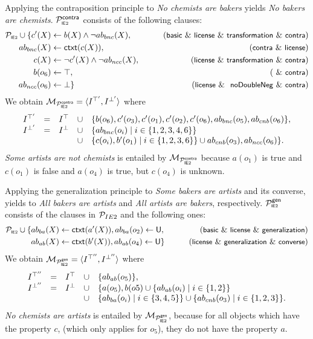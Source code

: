 \documentclass[12pt]{article}
\begin{document}
Applying the contraposition principle to \textit{No chemists are bakers} yields \textit{No bakers are chemists}.
${{\cal P}^{\tiny {\small\textsf{contra}}}_{\tiny\mbox{\textsf{I}\textsf{E}2}}}$ consists of the following clauses:
\begin{align*}
\Pie \cup \{ c'(X) & \leftarrow b(X) \wedge \neg \Ab_{bnc}(X), & \tag{\basic\ \&\ \licenses\ \&\ \transformation\  \&\  \contraposition} \\
\Ab_{bnc}(X) & \leftarrow \cxt(c(X)), & \tag{\contraposition\  \&\ \licenses} \\
c(X) & \leftarrow \neg c'(X) \wedge \neg \Ab_{ncc}(X), &  \tag{\licenses\ \&\ \transformation\  \&\  \contraposition} \\
b(o_6) & \leftarrow \top, & \tag{\ \&\ \contraposition} \\
\Ab_{ncc}(o_6) & \leftarrow \bot  \} & \tag{\licenses\ \& \ \dnegation\ \&\ \contraposition}
\end{align*}
We obtain ${\cal M}_{{{\cal P}^{\tiny {\small\textsf{contra}}}_{\tiny\mbox{\textsf{I}\textsf{E}2}}}} = \langle I^{\top'}, I^{\bot'} \rangle$ where 
\[
\begin{array}{lllll}
 I^{\top'} & = & I^\top & \cup & \{ b(o_6), c'(o_3), c'(o_1), c'(o_2), c'(o_6), ab_{bnc}(o_5), ab_{cnb}(o_6) \}, \\
I^{\bot'} & =  & I^\bot  & \cup & \{  ab_{bnc}(o_i) \mid i \in \{1,2,3,4,6 \} \} 
\\ &&& \cup  &
\{ c(o_i), b'(o_1) \mid i \in \{ 1, 2, 3, 6 \} \} \cup ab_{cnb}(o_3), ab_{ncc}(o_6) \}.
\end{array}
\]
\textit{Some artists are not chemists} is entailed by ${\cal M}_{{{\cal P}^{\tiny {\small\textsf{contra}}}_{\tiny\mbox{\textsf{I}\textsf{E}2}}}}$ because 
$a(o_1)$ is true and $c(o_1)$ is false and $a(o_4)$ is true, but $c(o_4)$ is unknown.

Applying the generalization principle to \textit{Some bakers are artists} and its converse,
yields to \textit{All bakers are artists} and \textit{All artists are bakers}, respectively.
${{\cal P}^{\tiny {\small\textsf{gen}}}_{\tiny\mbox{\textsf{I}\textsf{E}2}}}$ consists of the clauses in ${\cal P}_{IE2}$ and the following ones:
\begin{align}
\Pie \cup \{  \Ab_{ba}(X) & \leftarrow \cxt(a'(X)),  \Ab_{ba}(o_2) \leftarrow \udf, & \tag{\basic\ \&\ \licenses\ \&\ \negFailure} \\
  \Ab_{ab}(X) & \leftarrow \cxt(b'(X)),   \Ab_{ab}(o_4) \leftarrow \udf \}  & \tag{\licenses\ \&\ \negFailure\ \&\ \converse}
\end{align}
We obtain ${\cal M}_{{{\cal P}^{\tiny {\small\textsf{gen}}}_{\tiny\mbox{\textsf{I}\textsf{E}2}}}}  = \langle I^{\top''}, I^{\bot''} \rangle$ where 
\[
\begin{array}{lllll}
 I^{\top''} & = & I^\top & \cup & \{ab_{ab}(o_5)  \}, \\
I^{\bot''} & = & I^\bot & \cup & \{ a(o_5),  b(o5) \cup \{ ab_{ab}(o_i) \mid i \in \{ 1,2\}\} \\
& & & \cup &
\{ ab_{ba}(o_i) \mid i \in \{3, 4, 5 \} \} \cup \{ ab_{cnb}(o_3) \mid i \in \{1,2,3 \} \}.
\end{array}
\]
\textit{No chemists are artists} is entailed by ${\cal M}_{{{\cal P}^{\tiny {\small\textsf{gen}}}_{\tiny\mbox{\textsf{I}\textsf{E}2}}}}$, because 
for all objects which have the property $c$, (which only applies for $o_5$), they do not have the property $a$.
\end{document}
